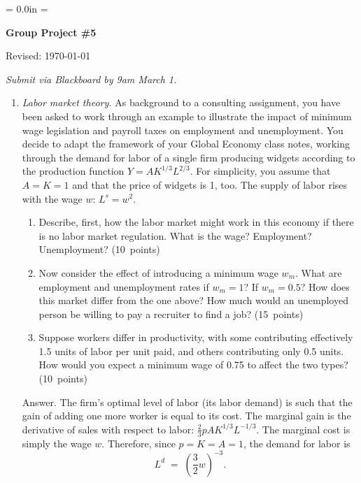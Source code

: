 \documentclass[letterpaper,12pt]{article}
\def\HeadName{Group Project \#5}
\begin{document}
\parindent = 0.0in
\parskip = \bigskipamount
\thispagestyle{empty}%
\Head

\centerline{\large \bf \HeadName}%
\centerline{Revised:  \today}

\medskip
{\it Submit via Blackboard by 9am March 1.}

\begin{enumerate}

\item {\it Labor market theory.\/} As background to a
consulting assignment, you have been asked to work through an
example to illustrate the impact of
minimum wage legislation and payroll taxes on employment and
unemployment. You decide to adapt the framework of your 
{Global Economy} class notes, 
working through the demand for labor
of a single firm producing widgets according to the production
function $Y= A K^{1/3}L^{2/3}$. For simplicity, you assume that
$A=K=1$ and that the price of widgets is 1, too.  The supply of
labor rises with the wage $w$: $L^{s}=w^{2}$.
%
\begin{enumerate}

\item Describe, first, how the labor market might work in this
economy if there is no labor market regulation.  
What is the wage?
Employment? Unemployment?  (10~points)

\item Now consider the effect of introducing a minimum wage
$w_{m}$.  What are employment and unemployment rates if $w_{m}=1$?
If $w_{m}=0.5$?  How does this market differ from the one above?
How much would an unemployed person be willing to pay a recruiter
to find a job?  
(15~points)

\item Suppose workers differ in productivity, 
with some contributing effectively 1.5 units of labor 
per unit paid, and others contributing only 0.5 units.  
How would you expect a minimum wage of 0.75 
to affect the two types?  
(10~points)

\end{enumerate}

Answer. The firm's optimal level of labor (its labor demand) is
such that the gain of adding one more worker is equal to its cost.
The marginal gain is the derivative of sales with respect to
labor: $\frac{2}{3}pAK^{1/3}L^{-1/3}$. The marginal cost is simply
the wage $w$. Therefore, since $p=K=A=1$, the demand for labor is
\[
    L^{d} \;=\; \left(\frac{3}{2}w\right)^{-3}.
\] 


\end{enumerate}
\end{document}
